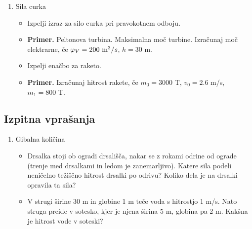 \begin{enumerate}
    \item Sila curka
    \begin{itemize}
        \item Izpelji izraz za silo curka pri pravokotnem odboju.
        \item \textbf{Primer.} Peltonova turbina. Maksimalna moč turbine. Izračunaj moč elektrarne, če \(\oldphi_V = 200 \ \text{m}^3/s\), \(h = 30\) m. 
        \item Izpelji enačbo za raketo.
        \item \textbf{Primer.} Izračunaj hitrost rakete, če \(m_0 = 3000\) T, \(v_0 = 2.6\) m/s, \(m_1 = 800\) T.
    \end{itemize}
\end{enumerate}

\newpage
\subsection*{Izpitna vprašanja}
\begin{enumerate}
    \item Gibalna količina
    \begin{itemize}
        \item Drsalka stoji ob ogradi drsališča, nakar se z rokami odrine od ograde (trenje med drsalkami in ledom je zanemarljivo). Katere sila podeli neničelno težiščno hitrost drsalki po odrivu? Koliko dela je na drsalki opravila ta sila?
        \item V strugi širine 30 m in globine 1 m teče voda s hitrostjo 1 m/s. Nato struga preide v sotesko, kjer je njena širina 5 m, globina pa 2 m. Kakšna je hitrost vode v soteski?
    \end{itemize}
\end{enumerate}